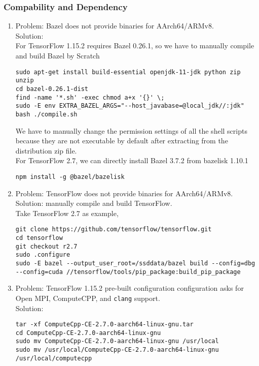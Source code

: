 \documentclass[a4paper]{article}
\begin{document}
\subsubsection{Compability and Dependency}
\begin{enumerate}
    \item Problem: Bazel does not provide binaries for AArch64/ARMv8.\\
    Solution:\\
    For TensorFlow 1.15.2 requires Bazel 0.26.1, so we have to manually compile and build Bazel by Scratch
    \begin{verbatim}
sudo apt-get install build-essential openjdk-11-jdk python zip unzip
cd bazel-0.26.1-dist
find -name '*.sh' -exec chmod a+x '{}' \;
sudo -E env EXTRA_BAZEL_ARGS="--host_javabase=@local_jdk//:jdk" bash ./compile.sh
    \end{verbatim}
    We have to manually change the permission settings of all the shell scripts because they are not executable by default after extracting from the distribution zip file.\\
    For TensorFlow 2.7, we can directly install Bazel 3.7.2 from bazelisk 1.10.1
    \begin{verbatim}
npm install -g @bazel/bazelisk
    \end{verbatim}
    \item Problem: TensorFlow does not provide binaries for AArch64/ARMv8.\\
    Solution: manually compile and build TensorFlow.\\
    Take TensorFlow 2.7 as example,
    \begin{verbatim}
git clone https://github.com/tensorflow/tensorflow.git
cd tensorflow
git checkout r2.7
sudo .configure
sudo -E bazel --output_user_root=/ssddata/bazel build --config=dbg --config=cuda //tensorflow/tools/pip_package:build_pip_package
    \end{verbatim}
    \item Problem: TensorFlow 1.15.2 pre-built configuration configuration asks for Open MPI, ComputeCPP, and \texttt{clang} support.\\
    Solution:
        \begin{verbatim}
tar -xf ComputeCpp-CE-2.7.0-aarch64-linux-gnu.tar
cd ComputeCpp-CE-2.7.0-aarch64-linux-gnu
sudo mv ComputeCpp-CE-2.7.0-aarch64-linux-gnu /usr/local
sudo mv /usr/local/ComputeCpp-CE-2.7.0-aarch64-linux-gnu /usr/local/computecpp

\end{verbatim}
\end{enumerate}
\end{document}
